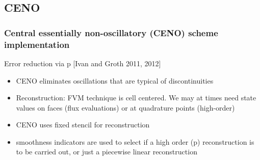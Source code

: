 \documentclass{beamer}
\begin{document}
\subsection{CENO}
\begin{frame}
\scriptsize
\frametitle{Central essentially non-oscillatory (CENO) scheme implementation} 

\begin{minipage}[t][1\textheight]{1\textwidth}
\vspace{-20pt}
\begin{exampleblock}{Error reduction via p}
\tiny
[Ivan and Groth 2011, 2012]
\begin{itemize}
\item CENO eliminates oscillations that are typical of discontinuities
\item Reconstruction: FVM technique is cell centered. We may at times need state values on faces (flux evaluations) or at quadrature points (high-order)
\item CENO uses fixed stencil for reconstruction
\item smoothness indicators are used to select if a high order (p) reconstruction is to be carried out, or just a piecewise linear reconstruction
\end{itemize}
\vspace{-20pt}
\tiny
\begin{figure}
\label{fig:h_order_error}
\centering
{}

\end{figure}
\end{exampleblock}
\end{minipage}
\end{frame}
\end{document}
